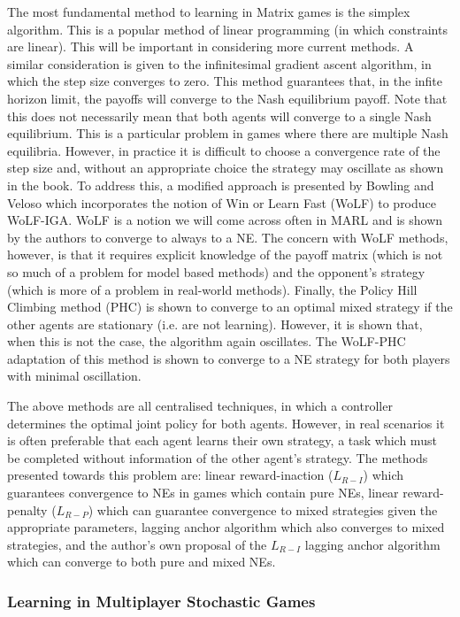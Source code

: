 \documentclass[preprint,8pt]{report}
\begin{document}
The most fundamental method to learning in Matrix games is the simplex algorithm. This is a popular method of linear programming (in which constraints are linear). This will be important in considering more current methods. A similar consideration is given to the infinitesimal gradient ascent algorithm, in which the step size converges to zero. This method guarantees that, in the infite horizon limit, the payoffs will converge to the Nash equilibrium payoff. Note that this does not necessarily mean that both agents will converge to a single Nash equilibrium. This is a particular problem in games where there are multiple Nash equilibria. However, in practice it is difficult to choose a convergence rate of the step size and, without an appropriate choice the strategy may oscillate as shown in the book. To address this, a modified approach is presented by Bowling and Veloso which incorporates the notion of Win or Learn Fast (WoLF) to produce WoLF-IGA. WoLF is a notion we will come across often in MARL and is shown by the authors to converge to always to a NE. The concern with WoLF methods, however, is that it requires explicit knowledge of the payoff matrix (which is not so much of a problem for model based methods) and the opponent's strategy (which is more of a problem in real-world methods). Finally, the Policy Hill Climbing method (PHC) is shown to converge to an optimal mixed strategy if the other agents are stationary (i.e. are not learning). However, it is shown that, when this is not the case, the algorithm again oscillates. The WoLF-PHC adaptation of this method is shown to converge to a NE strategy for both players with minimal oscillation. 

The above methods are all centralised techniques, in which a controller determines the optimal joint policy for both agents. However, in real scenarios it is often preferable that each agent learns their own strategy, a task which must be completed without information of the other agent's strategy. The methods presented towards this problem are: linear reward-inaction ($L_{R-I}$) which guarantees convergence to NEs in games which contain pure NEs, linear reward-penalty ($L_{R-P}$) which can guarantee convergence to mixed strategies given the appropriate parameters, lagging anchor algorithm which also converges to mixed strategies, and the author's own proposal of the $L_{R-I}$ lagging anchor algorithm which can converge to both pure and mixed NEs.

\subsubsection*{Learning in Multiplayer Stochastic Games}
\end{document}
